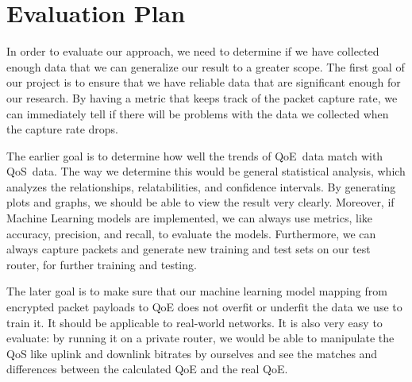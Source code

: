 \section{Evaluation Plan}\label{evaluation}
    In order to evaluate our approach, we need to determine if we have collected enough data that we can generalize our result to a greater scope. The first goal of our project is to ensure that we have reliable data that are significant enough for our research. By having a metric that keeps track of the packet capture rate, we can immediately tell if there will be problems with the data we collected when the capture rate drops.

    The earlier goal is to determine how well the trends of QoE~data match with QoS~data. The way we determine this would be general statistical analysis, which analyzes the relationships, relatabilities, and confidence intervals. By generating plots and graphs, we should be able to view the result very clearly. Moreover, if Machine Learning models are implemented, we can always use metrics, like accuracy, precision, and recall, to evaluate the models. Furthermore, we can always capture packets and generate new training and test sets on our test router, for further training and testing. 

    The later goal is to make sure that our machine learning model mapping from encrypted packet payloads to QoE does not overfit or underfit the data we use to train it. It should be applicable to real-world networks. It is also very easy to evaluate: by running it on a private router, we would be able to manipulate the QoS like uplink and downlink bitrates by ourselves and see the matches and differences between the calculated QoE and the real QoE. 

